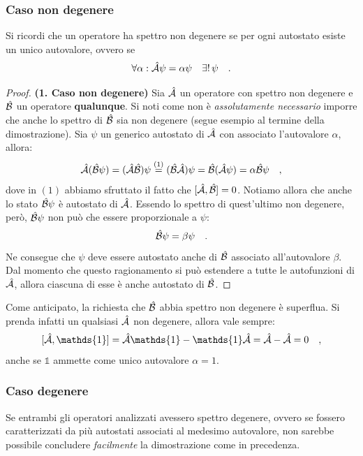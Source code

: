 \subsubsection{Caso non degenere}
Si ricordi che un operatore ha spettro non degenere se per ogni autostato esiste un unico autovalore, ovvero se
    \[
        \forall \alpha : \h{A}\psi = \alpha \psi \quad \exists! \, \psi \quad.
    \] 
\begin{proof}
    \textbf{(1. Caso non degenere)} 
    Sia $\h{A}$ un operatore con spettro non degenere e $\h{B}$ un operatore \textbf{qualunque}. Si noti come non è \emph{assolutamente necessario} imporre che anche lo spettro di $\h{B}$ sia non degenere (segue esempio al termine della dimostrazione). Sia $\psi$ un generico autostato di $\h{A}$ con associato l'autovalore $\alpha$, allora:
    \[
        \h{A}(\h{B}\psi) = (\h{A}\h{B})\psi \giustifica[=]{1} (\h{B}\h{A})\psi = \h{B}(\h{A}\psi) = \alpha \h{B}\psi \quad,
    \]
    dove in $(1)$ abbiamo sfruttato il fatto che $[\h{A}, \h{B}] = 0$. Notiamo allora che anche lo stato $\h{B}\psi$ è autostato di $\h{A}$. Essendo lo spettro di quest'ultimo non degenere, però, $\h{B}\psi$ non può che essere proporzionale a $\psi$:
    \[
        \h{B}\psi = \beta \psi \quad.
    \]
    Ne consegue che $\psi$ deve essere autostato anche di $\h{B}$ associato all'autovalore $\beta$. Dal momento che questo ragionamento si può estendere a tutte le autofunzioni di $\h{A}$, allora ciascuna di esse è anche autostato di $\h{B}$. 
\end{proof}
Come anticipato, la richiesta che $\h{B}$ abbia spettro non degenere è superflua. Si prenda infatti un qualsiasi $\h{A}$ non degenere, allora vale sempre:
\[
    [\h{A}, \mathds{1}] = \h{A}\mathds{1} - \mathds{1}\h{A} = \h{A} - \h{A} = 0 \quad,
\]
anche se $\mathds{1}$ ammette come unico autovalore $\alpha = 1$. 

\subsubsection{Caso degenere}
Se entrambi gli operatori analizzati avessero spettro degenere, ovvero se fossero caratterizzati da più autostati associati al medesimo autovalore, non sarebbe possibile concludere \emph{facilmente} la dimostrazione come in precedenza. 

